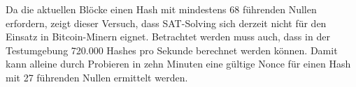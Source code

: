 Da die aktuellen Blöcke einen Hash mit mindestens 68 führenden Nullen erfordern, zeigt dieser Versuch, dass SAT-Solving sich
derzeit nicht für den Einsatz in Bitcoin-Minern eignet. Betrachtet werden muss auch, dass in der Testumgebung 720.000 Hashes pro Sekunde
berechnet werden können. Damit kann alleine durch Probieren in zehn Minuten eine gültige Nonce für einen Hash mit 27 führenden
Nullen ermittelt werden.